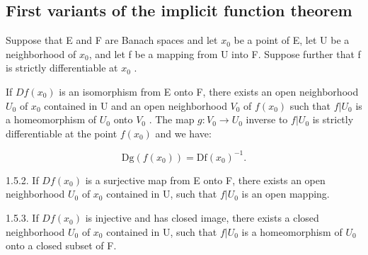 \subsection{First variants of the implicit function theorem}

Suppose that E and F are Banach spaces and let \(x_{0}\) be a point of E, let U be a neighborhood of \(x_{0}\), and let f be a mapping from U into F. Suppose further that f is strictly differentiable at \(x_{0}\) .

If \(Df(x_0)\) is an isomorphism from E onto F, there exists an open neighborhood \(U_0\) of \(x_0\) contained in U and an open neighborhood \(V_0\) of \(f(x_0)\) such that \(f|U_0\) is a homeomorphism of \(U_0\) onto \(V_0\) . The map \(g: V_0 \to U_0\) inverse to \(f|U_0\) is strictly differentiable at the point \(f(x_0)\) and we have:

\[
\mathrm{Dg} (f (x _ {0})) = \mathrm{Df} (x _ {0}) ^ {- 1}.
\]

1.5.2. If \(Df(x_{0})\) is a surjective map from E onto F, there exists an open neighborhood \(U_{0}\) of \(x_{0}\) contained in U, such that \(f|U_{0}\) is an open mapping.

1.5.3. If \(Df(x_{0})\) is injective and has closed image, there exists a closed neighborhood \(U_{0}\) of \(x_{0}\) contained in U, such that \(f|U_{0}\) is a homeomorphism of \(U_{0}\) onto a closed subset of F.

